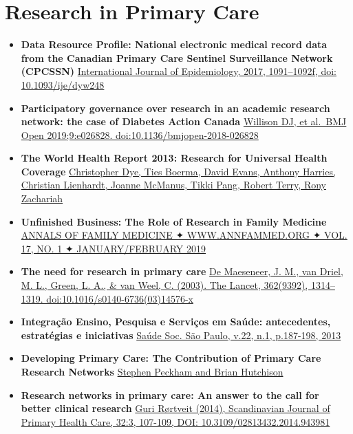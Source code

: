 \documentclass[]{book}
\begin{document}
\hypertarget{research-in-primary-care}{%
\section*{Research in Primary Care}\label{research-in-primary-care}}

\begin{itemize}
\item
  \textbf{Data Resource Profile: National electronic medical record data from the Canadian Primary Care Sentinel Surveillance Network (CPCSSN)} \href{https://sci-hub.tw/10.1093/ije/dyw248}{International Journal of Epidemiology, 2017, 1091--1092f, doi: 10.1093/ije/dyw248}
\item
  \textbf{Participatory governance over research in an academic research network: the case of Diabetes Action Canada} \href{https://bmjopen.bmj.com/content/bmjopen/9/4/e026828.full.pdf}{Willison DJ, et al.~BMJ Open 2019;9:e026828. doi:10.1136/bmjopen-2018-026828}
\item
  \textbf{The World Health Report 2013: Research for Universal Health Coverage} \href{https://www.researchgate.net/publication/259864310_The_World_Health_Report_2013_research_for_universal_health_coverage_World_Health_Organization_contributor_2013_ISBN_9789241564595_Available_from_httpappswhointirisbitstream106658576129789240690837_eng}{Christopher Dye, Ties Boerma, David Evans, Anthony Harries, Christian Lienhardt, Joanne McManus, Tikki Pang, Robert Terry, Rony Zachariah}
\item
  \textbf{Unfinished Business: The Role of Research in Family Medicine} \href{http://www.annfammed.org/content/17/1/70.full.pdf+html}{ANNALS OF FAMILY MEDICINE ✦ WWW.ANNFAMMED.ORG ✦ VOL. 17, NO. 1 ✦ JANUARY/FEBRUARY 2019}
\item
  \textbf{The need for research in primary care} \href{https://sci-hub.tw/https://doi.org/10.1016/S0140-6736(03)14576-X}{De Maeseneer, J. M., van Driel, M. L., Green, L. A., \& van Weel, C. (2003). The Lancet, 362(9392), 1314--1319. doi:10.1016/s0140-6736(03)14576-x}
\item
  \textbf{Integração Ensino, Pesquisa e Serviços em Saúde: antecedentes, estratégias e iniciativas} \href{http://www.scielo.br/pdf/sausoc/v22n1/17.pdf}{Saúde Soc. São Paulo, v.22, n.1, p.187-198, 2013}
\item
  \textbf{Developing Primary Care: The Contribution of Primary Care Research Networks} \href{https://www.ncbi.nlm.nih.gov/pmc/articles/PMC3517873/}{Stephen Peckham and Brian Hutchison}
\item
  \textbf{Research networks in primary care: An answer to the call for better clinical research} \href{https://www.tandfonline.com/doi/pdf/10.3109/02813432.2014.943981?needAccess=true}{Guri Rørtveit (2014), Scandinavian Journal of Primary Health Care, 32:3, 107-109, DOI: 10.3109/02813432.2014.943981}
\end{itemize}
\end{document}
